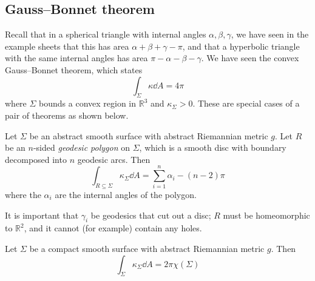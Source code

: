 \subsection{Gauss--Bonnet theorem}
Recall that in a spherical triangle with internal angles \( \alpha, \beta, \gamma \), we have seen in the example sheets that this has area \( \alpha + \beta + \gamma - \pi \), and that a hyperbolic triangle with the same internal angles has area \( \pi - \alpha - \beta - \gamma \).
We have seen the convex Gauss--Bonnet theorem, which states
\[
	\int_\Sigma \kappa \dd{A} = 4\pi
\]
where \( \Sigma \) bounds a convex region in \( \mathbb R^3 \) and \( \kappa_\Sigma > 0 \).
These are special cases of a pair of theorems as shown below.
\begin{theorem}
	Let \( \Sigma \) be an abstract smooth surface with abstract Riemannian metric \( g \).
	Let \( R \) be an \( n \)-sided \textit{geodesic polygon} on \( \Sigma \), which is a smooth disc with boundary decomposed into \( n \) geodesic arcs.
	Then
	\[
		\int_{R \subseteq \Sigma} \kappa_\Sigma \dd{A} = \sum_{i=1}^n \alpha_i - (n-2)\pi
	\]
	where the \( \alpha_i \) are the internal angles of the polygon.
\end{theorem}
It is important that \( \gamma_i \) be geodesics that cut out a disc; \( R \) must be homeomorphic to \( \mathbb R^2 \), and it cannot (for example) contain any holes.
\begin{theorem}
	Let \( \Sigma \) be a compact smooth surface with abstract Riemannian metric \( g \).
	Then
	\[
		\int_\Sigma \kappa_\Sigma \dd{A} = 2\pi \chi(\Sigma)
	\]
\end{theorem}
